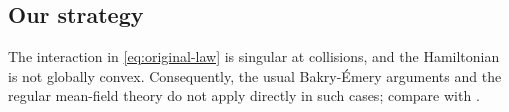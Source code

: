 \documentclass[12pt,reqno,letterpaper]{amsart}
\theoremstyle{definition}
\theoremstyle{remark}
\numberwithin{equation}{section}
\newcommand{\dd}{\,\mathrm d}
\newcommand{\be}{\beta}
\begin{document}



\subsection{Our strategy}
The interaction in \eqref{eq:original-law} is singular at collisions, and
the Hamiltonian is not globally convex. Consequently, the usual
Bakry-\'Emery arguments and the regular mean-field theory do not apply
directly in such cases; compare with \cite{GLWZ}.
\end{document}
